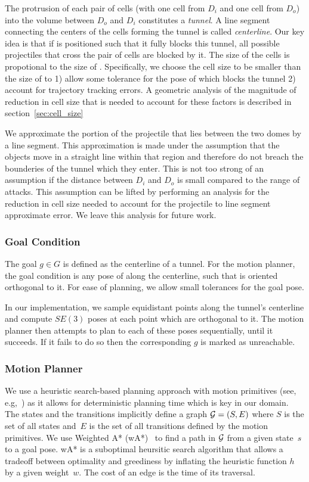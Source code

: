 \documentclass[a4paper]{report}
\begin{document}
The protrusion of each pair of cells (with one cell from $D_i$ and one cell from $D_o$) into the volume between $D_o$ and $D_i$ constitutes a \emph{tunnel}. A line segment connecting the centers of the cells forming the tunnel is called \emph{centerline}. Our key idea is that if \calS is positioned such that it fully blocks this tunnel, all possible projectiles that cross the pair of cells are blocked by it.
%
The size of the cells is propotional to the size of \calS. Specifically, we choose the cell size to be smaller than the size of \calS to 1) allow some tolerance for the pose of \calS which blocks the tunnel 2) account for trajectory tracking errors.
%
A geometric analysis of the magnitude of reduction in cell size that is needed to account for these factors is described in section~\ref{sec:cell_size}

We approximate the portion of the projectile that lies between the two domes by a line segment. This approximation is made under the assumption that the objects move in a straight line within that region and therefore do not breach the bounderies of the tunnel which they enter. This is not too strong of an assumption if the distance between $D_i$ and $D_o$ is small compared to the range of attacks.
This assumption can be lifted by performing an analysis for the reduction in cell size needed to account for the projectile to line segment approximate error. We leave this analysis for future work.
%

\subsubsection{Goal Condition}
The goal $g \in G$ is defined as the centerline of a tunnel. For the motion planner, the goal condition is any pose of \calS along the centerline, such that \calS is oriented orthogonal to it. For ease of planning, we allow small tolerances for the goal pose.

In our implementation, we sample equidistant points along the tunnel's centerline and compute $SE(3)$ poses at each point which are orthogonal to it. The motion planner then attempts to plan to each of these poses sequentially, until it succeeds. If it fails to do so then the corresponding $g$ is marked as unreachable.
 
\subsubsection{Motion Planner}
We use a heuristic search-based planning approach with motion primitives (see, e.g,~\cite{CCL10,CSCL11,LF09})
as it allows for deterministic planning time which is key in our domain.
The states and the transitions implicitly define a graph $\mathcal{G} = (S,E)$ where $S$ is the set of all states and~$E$ is the set of all transitions defined by the motion primitives. We use Weighted A* (wA*)~\cite{pohl1970heuristic} to find a path in $\mathcal{G}$ from a given state~$s$ to a goal pose. 
wA* is a suboptimal heursitic search algorithm that allows a tradeoff between optimality and greediness by inflating the heuristic function $h$ by a given weight~$w$. The cost of an edge is the time of its traversal.
\end{document}
